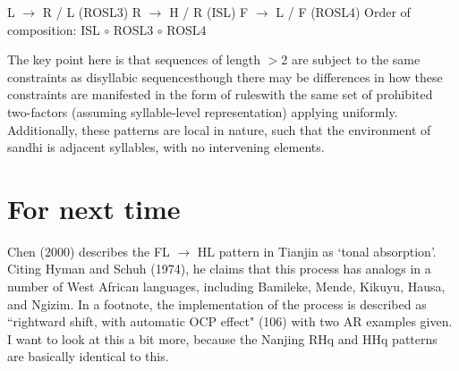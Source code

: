 \documentclass{article}
\begin{document}
\begin{exe}
\ex
\begin{xlist}
	\ex L $\rightarrow$ R / \underline{\hspace{1em}} L (ROSL3) 
	\ex R $\rightarrow$ H / \underline{\hspace{1em}} R (ISL) 
	\ex F $\rightarrow$ L / \underline{\hspace{1em}} F (ROSL4) 
	\ex Order of composition: ISL $\circ$ ROSL3 $\circ$ ROSL4
\end{xlist}
\end{exe}
The key point here is that sequences of length $>$2 are subject to the same constraints as disyllabic sequences\textemdash though there may be differences in how these constraints are manifested in the form of rules\textemdash with the same set of prohibited two-factors (assuming syllable-level representation) applying uniformly. Additionally, these patterns are local in nature, such that the environment of sandhi is adjacent syllables, with no intervening elements.
\section{For next time}
Chen (2000) describes the FL $\rightarrow$ HL pattern in Tianjin as `tonal absorption'. Citing Hyman and Schuh (1974), he claims that this process has analogs in a number of West African languages, including Bamileke, Mende, Kikuyu, Hausa, and Ngizim. In a footnote, the implementation of the process is described as ``rightward shift, with automatic OCP effect" (106) with two AR examples given. I want to look at this a bit more, because the Nanjing RHq and HHq patterns are basically identical to this.
\end{document}
